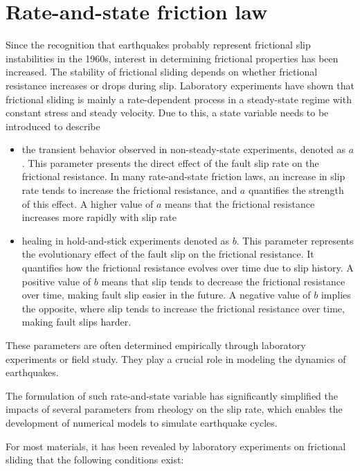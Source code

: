 \section{Rate-and-state friction law}
Since the recognition that earthquakes probably represent frictional slip instabilities in the 1960s, interest in determining frictional properties has been increased.
The stability of frictional sliding depends on whether frictional resistance increases or drops during slip.
Laboratory experiments have shown that frictional sliding is mainly a rate-dependent process in a steady-state regime with constant stress and steady velocity.
Due to this, a state variable needs to be introduced to describe
\begin{itemize}
    \item the transient behavior observed in non-steady-state experiments, denoted as $a$. This parameter presents the direct effect of the fault slip rate on the frictional resistance. In many rate-and-state friction laws, an increase in slip rate tends to increase the frictional resistance, and $a$ quantifies the strength of this effect. A higher value of $a$ means that the frictional resistance increases more rapidly with slip rate
    \item healing in hold-and-stick experiments denoted as $b$. This parameter represents the evolutionary effect of the fault slip on the frictional resistance. It quantifies how the frictional resistance evolves over time due to slip history. A positive value of $b$ means that slip tends to decrease the frictional resistance over time, making fault slip easier in the future. A negative value of $b$ implies the opposite, where slip tends to increase the frictional resistance over time, making fault slips harder.
\end{itemize}
These parameters are often determined empirically through laboratory experiments or field study. They play a crucial role in modeling the dynamics of earthquakes.

The formulation of such rate-and-state variable has significantly simplified the impacts of several parameters from rheology on the slip rate, which enables the development of numerical models to simulate earthquake cycles.

For most materials, it has been revealed by laboratory experiments on frictional sliding that the following conditions exist:

